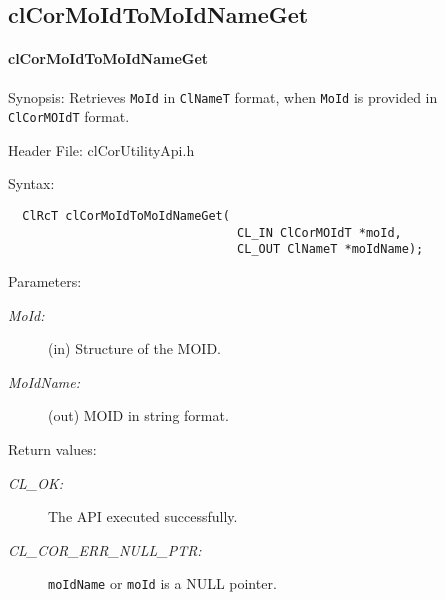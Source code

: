 \begin{flushleft}
\subsection{clCorMoIdToMoIdNameGet}
\hypertarget{pagecor122}{}\paragraph{cl\-Cor\-MoId\-To\-MoId\-Name\-Get}\label{pagecor122}
\begin{Desc}
\item[Synopsis:] Retrieves {\tt{MoId}} in {\tt{ClNameT}} format, when {\tt{MoId}} is provided in {\tt{ClCorMOIdT}} format.\end{Desc}
\begin{Desc}
\item[Header File:]clCorUtilityApi.h\end{Desc}
\begin{Desc}
\item[Syntax:]

\footnotesize\begin{verbatim}  ClRcT clCorMoIdToMoIdNameGet(
                         		CL_IN ClCorMOIdT *moId,
                         		CL_OUT ClNameT *moIdName);
\end{verbatim}
\normalsize
\end{Desc}
\begin{Desc}
\item[Parameters:]
\begin{description}
\item[{\em MoId:}](in) Structure of the MOID. 
\item[{\em MoId\-Name:}](out) MOID in string format.\end{description}
\end{Desc}

\begin{Desc}
\item[Return values:]
\begin{description}
\item[{\em CL\_\-OK:}]The API executed successfully.
\item[{\em CL\_\-COR\_\-ERR\_\-NULL\_\-PTR:}] {\tt{moIdName}} or {\tt{moId}} is a NULL pointer.
\end{description}
\end{Desc}


\end{flushleft}

